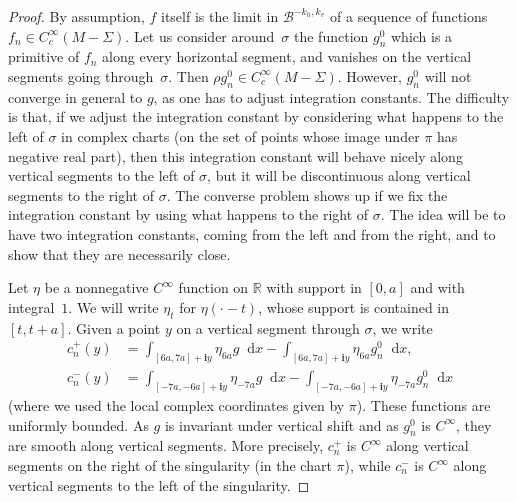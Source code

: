 \documentclass[10pt]{amsart}
\newcommand{\boB}{\mathcal{B}}
\newcommand{\R}{\mathbb{R}}
\newcommand{\dd}{\mathop{}\!\mathrm{d}}
\newcommand{\ic}{\mathbf{i}}
\theoremstyle{definition}
\numberwithin{equation}{section}
\begin{document}
\begin{proof}
By assumption, $f$ itself is the limit in $\boB^{-k_h, k_v}$ of a sequence of
functions $f_n \in C^\infty_c(M-\Sigma)$. Let us consider around~$\sigma$ the
function $g^0_n$ which is a primitive of $f_n$ along every horizontal
segment, and vanishes on the vertical segments going through~$\sigma$. Then
$\rho g^0_n \in C^\infty_c(M-\Sigma)$. However, $g_n^0$ will not converge in
general to $g$, as one has to adjust integration constants. The difficulty is
that, if we adjust the integration constant by considering what happens to
the left of $\sigma$ in complex charts (\ie on the set of points whose
image under $\pi$ has negative real part), then this integration constant
will behave nicely along vertical segments to the left of $\sigma$, but it
will be discontinuous along vertical segments to the right of $\sigma$. The
converse problem shows up if we fix the integration constant by using what
happens to the right of $\sigma$. The idea will be to have two integration
constants, coming from the left and from the right, and to show that they are
necessarily close.

Let $\eta$ be a nonnegative $C^\infty$ function on $\R$ with support in
$[0,a]$ and with integral~$1$. We will write $\eta_t$ for $\eta(\cdot -t)$,
whose support is contained in $[t, t+a]$. Given a point $y$ on a vertical
segment through $\sigma$, we write
\begin{align*}
c_n^+(y) & = \int_{[6a, 7a] + \ic y} \eta_{6a} g \dd x
- \int_{[6a, 7a] + \ic y} \eta_{6a} g^0_n \dd x,
\\
c_n^-(y) & = \int_{[-7a, -6a] + \ic y} \eta_{-7a} g \dd x
- \int_{[-7a, -6a] + \ic y} \eta_{-7a} g^0_n \dd x
\end{align*}
(where we used the local complex coordinates given by $\pi$). These functions
are uniformly bounded. As $g$ is invariant under vertical shift and as
$g^0_n$ is $C^\infty$, they are smooth along vertical segments. More
precisely, $c_n^+$ is $C^\infty$ along vertical segments on the right of the
singularity (in the chart $\pi$), while $c_n^-$ is $C^\infty$ along vertical
segments to the left of the singularity.


\end{proof}
\end{document}
